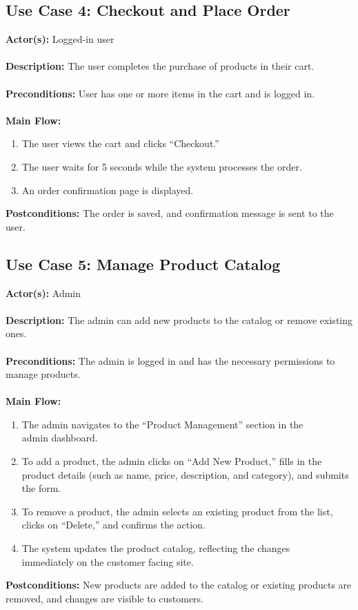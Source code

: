 \documentclass[a4paper,12pt]{article}
\begin{document}
	\subsection*{Use Case 4: Checkout and Place Order}
	\textbf{Actor(s):} Logged-in user \\ \\
	\textbf{Description:} The user completes the purchase of products in their cart. \\ \\
	\textbf{Preconditions:} User has one or more items in the cart and is logged in. \\ \\
	\textbf{Main Flow:}
	\begin{enumerate}
  		\item The user views the cart and clicks ``Checkout.''
  		\item The user waits for 5 seconds while the system processes the order.
  		\item An order confirmation page is displayed.
	\end{enumerate}
	\textbf{Postconditions:} The order is saved, and confirmation message is sent to the user.


	\subsection*{Use Case 5: Manage Product Catalog}
	\textbf{Actor(s):} Admin \\ \\
	\textbf{Description:} The admin can add new products to the catalog or remove existing ones. \\ \\			\textbf{Preconditions:} The admin is logged in and has the necessary permissions to manage products.
	\\ \\
	\textbf{Main Flow:}
	\begin{enumerate}
  	\item The admin navigates to the ``Product Management'' section in the \\ admin dashboard.
  	\item To add a product, the admin clicks on ``Add New Product,'' fills in the product details (such
  	as name, price, description, and category), and submits the form.
  	\item To remove a product, the admin selects an existing product from the list, clicks on
  	``Delete,'' and confirms the action.
  	\item The system updates the product catalog, reflecting the changes \\ immediately on the customer
  	facing site.
	\end{enumerate}
	\textbf{Postconditions:} New products are added to the catalog or existing products are removed, and
	changes are visible to customers.
\end{document}
